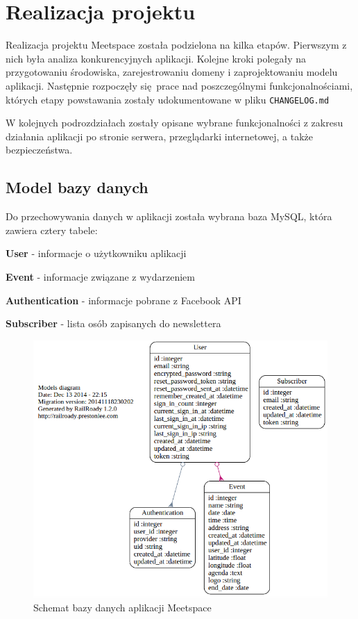 \section{Realizacja projektu}
Realizacja projektu Meetspace została podzielona na kilka etapów. Pierwszym z nich była analiza konkurencyjnych aplikacji. Kolejne kroki polegały na przygotowaniu środowiska, zarejestrowaniu domeny i zaprojektowaniu modelu aplikacji. Następnie rozpoczęły się prace nad poszczególnymi funkcjonalnościami, których etapy powstawania zostały udokumentowane w pliku \texttt{CHANGELOG.md}

W kolejnych podrozdziałach zostały opisane wybrane funkcjonalności z zakresu działania aplikacji po stronie serwera, przeglądarki internetowej, a także bezpieczeństwa.
  \clearpage
  \subsection{Model bazy danych}
    Do przechowywania danych w aplikacji została wybrana baza MySQL, która zawiera cztery tabele:
    \begin{itemizeReduced}
      \item \textbf{User} - informacje o użytkowniku aplikacji
      \item \textbf{Event} - informacje związane z wydarzeniem
      \item \textbf{Authentication} - informacje pobrane z Facebook API
      \item \textbf{Subscriber} - lista osób zapisanych do newslettera
    \end{itemizeReduced}

    \begin{figure}[h]
      \centering
        \includegraphics[scale=0.55]{images/dbm.png}
      \caption{Schemat bazy danych aplikacji Meetspace}
      \label{fig:dbm}
    \end{figure}

